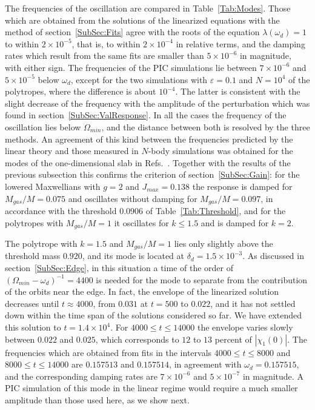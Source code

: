 The frequencies of the oscillation are compared in Table~\ref{Tab:Modes}. Those which are obtained from the solutions of the linearized equations with the method of section~\ref{SubSec:Fits} agree with the roots of the equation $\lambda(\omega_d) = 1$ to within $2\times 10^{-5}$, that is, to within $2\times 10^{-4}$ in relative terms, and the damping rates which result from the same fits are smaller than $5\times 10^{-6}$ in magnitude, with either sign. The frequencies of the PIC simulations lie between $7\times 10^{-6}$ and $5\times 10^{-5}$ below $\omega_d$, except for the two simulations with $\varepsilon = 0.1$ and $N = 10^4$ of the polytropes, where the difference is about $10^{-4}$. The latter is consistent with the slight decrease of the frequency with the amplitude of the perturbation which was found in section~\ref{SubSec:ValResponse}. In all the cases the frequency of the oscillation lies below $\Omega_{min}$, and the distance between both is resolved by the three methods. An agreement of this kind between the frequencies predicted by the linear theory and those measured in $N$-body simulations was obtained for the modes of the one-dimensional slab in Refs.~\cite{mW91,pL92}. Together with the results of the previous subsection this confirms the criterion of section~\ref{SubSec:Gain}: for the lowered Maxwellians with $g = 2$ and $J_{max} = 0.138$ the response is damped for $M_{gas}/M = 0.075$ and oscillates without damping for $M_{gas}/M = 0.097$, in accordance with the threshold $0.0906$ of Table~\ref{Tab:Threshold}, and for the polytropes with $M_{gas}/M = 1$ it oscillates for $k\leq 1.5$ and is damped for $k = 2$. 

The polytrope with $k = 1.5$ and $M_{gas}/M = 1$ lies only slightly above the threshold mass $0.920$, and its mode is located at $\delta_d = 1.5\times 10^{-3}$. As discussed in section~\ref{SubSec:Edge}, in this situation a time of the order of $(\Omega_{min} - \omega_d)^{-1} = 4400$ is needed for the mode to separate from the contribution of the orbits near the edge. In fact, the envelope of the linearized solution decreases until $t\approx 4000$, from $0.031$ at $t = 500$ to $0.022$, and it has not settled down within the time span of the solutions considered so far. We have extended this solution to $t = 1.4\times 10^4$. For $4000\leq t\leq 14000$ the envelope varies slowly between $0.022$ and $0.025$, which corresponds to $12$ to $13$ percent of $|\chi_1(0)|$. The frequencies which are obtained from fits in the intervals $4000\leq t\leq 8000$ and $8000\leq t\leq 14000$ are $0.157513$ and $0.157514$, in agreement with $\omega_d = 0.157515$, and the corresponding damping rates are $7\times 10^{-6}$ and $5\times 10^{-7}$ in magnitude. A PIC simulation of this mode in the linear regime would require a much smaller amplitude than those used here, as we show next.


